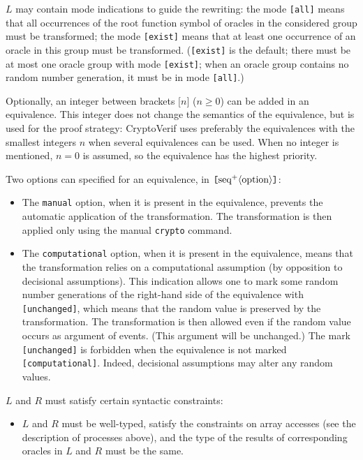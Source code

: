 \begin{itemize}
$L$ may contain mode indications to guide the rewriting: the mode
\texttt{[all]} means that all occurrences of the root function symbol
of oracles in the considered group must be transformed;
the mode \texttt{[exist]} means that at least one occurrence of an
oracle in this group must be transformed. (\texttt{[exist]} is the default;
there must be at most one oracle group with mode \texttt{[exist]};
when an oracle group contains no random number generation, it must be in mode 
\texttt{[all]}.)

Optionally, 
an integer between brackets $\texttt{[}n\texttt{]}$ ($n \geq 0$)
can be added in an equivalence.
This integer does not change the semantics of the equivalence, but is
used for the proof strategy: CryptoVerif uses preferably the equivalences
with the smallest integers $n$ when several equivalences can be used.
When no integer is mentioned,
$n = 0$ is assumed, so the equivalence has the highest priority.

Two options can specified for an equivalence, in
$\texttt{[}\textrm{seq}^+\langle\textrm{option}\rangle\texttt{]}$:
\begin{itemize}

\item The \texttt{manual} option, when it is present in the equivalence,
prevents the automatic application of the transformation. The transformation
is then applied only using the manual \texttt{crypto} command.

\item The \texttt{computational} option, when it is present in the 
equivalence, means that the transformation relies on a computational assumption
(by opposition to decisional assumptions). This indication allows one to mark
some random number generations of the right-hand side of the equivalence with
\texttt{[unchanged]}, which means that the random value is preserved by 
the transformation. The transformation is then allowed even if the random 
value occurs as argument of events. (This argument will be unchanged.)
The mark \texttt{[unchanged]} is forbidden when the equivalence is
not marked \texttt{[computational]}. Indeed, decisional assumptions may
alter any random values.

\end{itemize}

$L$ and $R$ must satisfy certain syntactic constraints:
\begin{itemize}

\item %
$L$ and $R$ must be well-typed, satisfy the constraints on
array accesses (see the description of processes above), 
and the type of the results of 
corresponding oracles in $L$ and $R$ must be the same.


\end{itemize}
\end{itemize}
